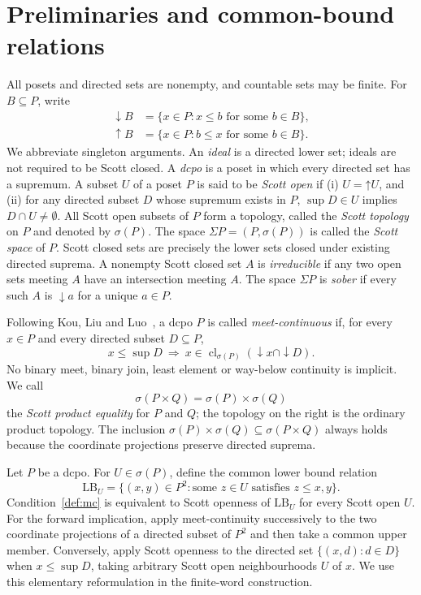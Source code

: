 \documentclass[fleqn,preprint,3p,a4paper]{elsarticle}
\theoremstyle{definition}
\begin{document}
\section{Preliminaries and common-bound relations}\label{sec:relations}
All posets and directed sets are nonempty, and countable sets may be finite. For $B\subseteq P$, write
\[
\begin{aligned}
 {\downarrow} B&=\{x\in P:x\leq b\text{ for some }b\in B\},\\
 {\uparrow} B&=\{x\in P:b\leq x\text{ for some }b\in B\}.
\end{aligned}
\]
We abbreviate singleton arguments. An \emph{ideal} is a directed lower set; ideals are not required to be Scott closed. A \emph{dcpo} is a poset in which every directed set has a supremum. A subset $U$ of a poset $P$ is said to be \emph{Scott open} if (i) $U=\mathord{\uparrow}U$, and (ii) for any directed subset $D$ whose supremum exists in $P$, $\sup D\in U$ implies $D\cap U\neq\emptyset$.  All Scott open subsets of $P$ form a topology, called the \emph{Scott topology} on $P$ and denoted by $\sigma(P)$. The space $\Sigma P=(P,\sigma(P))$ is called the \emph{Scott space} of $P$. Scott closed sets are precisely the lower sets closed under existing directed suprema. A nonempty Scott closed set $A$ is \emph{irreducible} if any two open sets meeting $A$ have an intersection meeting $A$. The space $\Sigma P$ is \emph{sober} if every such $A$ is ${\downarrow} a$ for a unique $a\in P$.

Following Kou, Liu and Luo~\cite{KLL}, a dcpo $P$ is called \emph{meet-continuous} if, for every $x\in P$ and every directed subset $D\subseteq P$,
\begin{equation}\label{def:mc}
 x\leq\sup D
 ~\Longrightarrow~
 x\in\operatorname{cl}_{\sigma(P)}
       ({\downarrow} x\cap{\downarrow}D).
\end{equation}
No binary meet, binary join, least element or way-below continuity is implicit. We call
\[
 \sigma(P\times Q)=\sigma(P)\times\sigma(Q)
\]
the \emph{Scott product equality} for $P$ and $Q$; the topology on the right is the ordinary product topology. The inclusion $\sigma(P)\times\sigma(Q)\subseteq\sigma(P\times Q)$ always holds because the coordinate projections preserve directed suprema.

Let $P$ be a dcpo. For $U\in\sigma(P)$, define the common lower bound relation
\[
 \mathrm{LB}_U
 =\{(x,y)\in P^2:\text{some }z\in U\text{ satisfies }z\leq x,y\}.
\]
Condition~\eqref{def:mc} is equivalent to Scott openness of $\mathrm{LB}_U$ for every Scott open $U$. For the forward implication, apply meet-continuity successively to the two coordinate projections of a directed subset of $P^2$ and then take a common upper member. Conversely, apply Scott openness to the directed set $\{(x,d):d\in D\}$ when $x\leq\sup D$, taking arbitrary Scott open neighbourhoods $U$ of $x$. We use this elementary reformulation in the finite-word construction.
\end{document}
